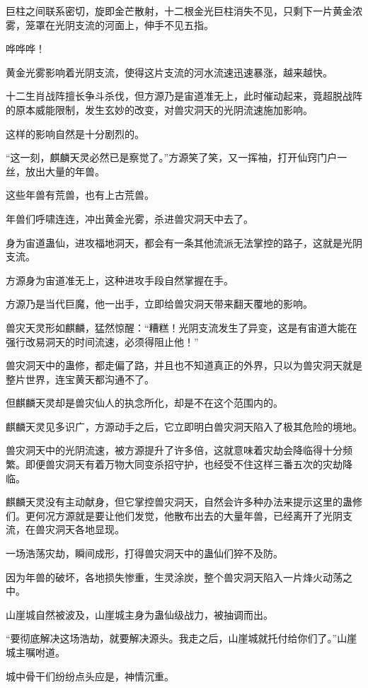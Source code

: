 \begin{this_body}
巨柱之间联系密切，旋即金芒散射，十二根金光巨柱消失不见，只剩下一片黄金浓雾，笼罩在光阴支流的河面上，伸手不见五指。

哗哗哗！

黄金光雾影响着光阴支流，使得这片支流的河水流速迅速暴涨，越来越快。

十二生肖战阵擅长争斗杀伐，但方源乃是宙道准无上，此时催动起来，竟超脱战阵的原本威能限制，发生玄妙的改变，对兽灾洞天的光阴流速施加影响。

这样的影响自然是十分剧烈的。

“这一刻，麒麟天灵必然已是察觉了。”方源笑了笑，又一挥袖，打开仙窍门户一丝，放出大量的年兽。

这些年兽有荒兽，也有上古荒兽。

年兽们呼啸连连，冲出黄金光雾，杀进兽灾洞天中去了。

身为宙道蛊仙，进攻福地洞天，都会有一条其他流派无法掌控的路子，这就是光阴支流。

方源身为宙道准无上，这种进攻手段自然掌握在手。

方源乃是当代巨魔，他一出手，立即给兽灾洞天带来翻天覆地的影响。

兽灾天灵形如麒麟，猛然惊醒：“糟糕！光阴支流发生了异变，这是有宙道大能在强行改易洞天的时间流速，必须得阻止他！”

兽灾洞天中的蛊修，都走偏了路，并且也不知道真正的外界，只以为兽灾洞天就是整片世界，连宝黄天都沟通不了。

但麒麟天灵却是兽灾仙人的执念所化，却是不在这个范围内的。

麒麟天灵见多识广，方源动手之后，它立即明白兽灾洞天陷入了极其危险的境地。

兽灾洞天中的光阴流速，被方源提升了许多倍，这就意味着灾劫会降临得十分频繁。即便兽灾洞天有着万物大同变杀招守护，也经受不住这样三番五次的灾劫降临。

麒麟天灵没有主动献身，但它掌控兽灾洞天，自然会许多种办法来提示这里的蛊修们。更何况方源就是要让他们发觉，他散布出去的大量年兽，已经离开了光阴支流，在兽灾洞天各地显现。

一场浩荡灾劫，瞬间成形，打得兽灾洞天中的蛊仙们猝不及防。

因为年兽的破坏，各地损失惨重，生灵涂炭，整个兽灾洞天陷入一片烽火动荡之中。

山崖城自然被波及，山崖城主身为蛊仙级战力，被抽调而出。

“要彻底解决这场浩劫，就要解决源头。我走之后，山崖城就托付给你们了。”山崖城主嘱咐道。

城中骨干们纷纷点头应是，神情沉重。


\end{this_body}
